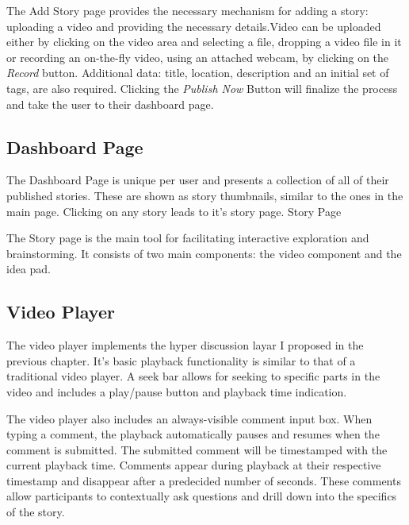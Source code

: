 
The Add Story page provides the necessary mechanism for adding a story: uploading a video and providing the necessary details.Video can be uploaded either by clicking on the video area and selecting a file, dropping a video file in it or recording an on-the-fly video, using an attached webcam, by clicking on the \textit{Record} button. Additional data: title, location, description and an initial set of tags, are also required. Clicking the \textit{Publish Now} Button will finalize the process and take the user to their dashboard page. 

\subsection{Dashboard Page}


The Dashboard Page is unique per user and presents a collection of all of their published stories. These are shown as story thumbnails, similar to the ones in the main page. Clicking on any story leads to it's story page. 
Story Page


The Story page is the main tool for facilitating interactive exploration and brainstorming. It consists of two main components: the video component and the idea pad.

\subsection{Video Player}

The video player implements the hyper discussion layar I proposed in the previous chapter. It's basic playback functionality is similar to that of a traditional video player. A seek bar allows for seeking to specific parts in the video and includes a play/pause button and playback time indication.

The video player also includes an always-visible comment input box. When typing a comment, the playback automatically pauses and resumes when the comment is submitted. The submitted comment will be timestamped with the current playback time. Comments appear during playback at their respective timestamp and disappear after a predecided number of seconds. These comments allow participants to contextually ask questions and drill down into the specifics of the story.  


